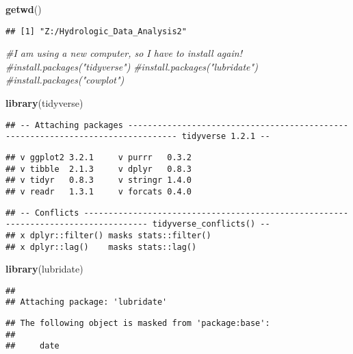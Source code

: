 \documentclass[]{article}
\newenvironment{Shaded}{\begin{snugshade}}{\end{snugshade}}
\newcommand{\CommentTok}[1]{\textcolor[rgb]{0.56,0.35,0.01}{\textit{#1}}}
\newcommand{\KeywordTok}[1]{\textcolor[rgb]{0.13,0.29,0.53}{\textbf{#1}}}
\newcommand{\NormalTok}[1]{#1}
\begin{document}
\begin{Shaded}
\begin{Highlighting}[]
\KeywordTok{getwd}\NormalTok{()}
\end{Highlighting}
\end{Shaded}

\begin{verbatim}
## [1] "Z:/Hydrologic_Data_Analysis2"
\end{verbatim}

\begin{Shaded}
\begin{Highlighting}[]
\CommentTok{#I am using a new computer, so I have to install again!}
\CommentTok{#install.packages("tidyverse")}
\CommentTok{#install.packages("lubridate")}
\CommentTok{#install.packages("cowplot") }

\KeywordTok{library}\NormalTok{(tidyverse)}
\end{Highlighting}
\end{Shaded}

\begin{verbatim}
## -- Attaching packages -------------------------------------------------------------------------------- tidyverse 1.2.1 --
\end{verbatim}

\begin{verbatim}
## v ggplot2 3.2.1     v purrr   0.3.2
## v tibble  2.1.3     v dplyr   0.8.3
## v tidyr   0.8.3     v stringr 1.4.0
## v readr   1.3.1     v forcats 0.4.0
\end{verbatim}

\begin{verbatim}
## -- Conflicts ----------------------------------------------------------------------------------- tidyverse_conflicts() --
## x dplyr::filter() masks stats::filter()
## x dplyr::lag()    masks stats::lag()
\end{verbatim}

\begin{Shaded}
\begin{Highlighting}[]
\KeywordTok{library}\NormalTok{(lubridate)}
\end{Highlighting}
\end{Shaded}

\begin{verbatim}
## 
## Attaching package: 'lubridate'
\end{verbatim}

\begin{verbatim}
## The following object is masked from 'package:base':
## 
##     date
\end{verbatim}
\end{document}
